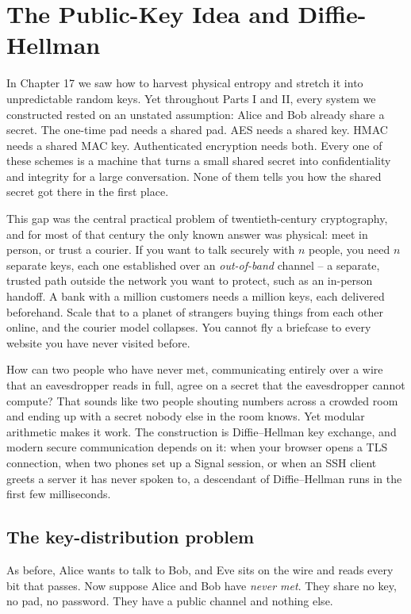\chapter{The Public-Key Idea and Diffie-Hellman}

In Chapter 17 we saw how to harvest physical entropy and stretch it into unpredictable random keys. Yet throughout Parts I and II, every system we constructed rested on an unstated assumption: Alice and Bob already share a secret. The one-time pad needs a shared pad. AES needs a shared key. HMAC needs a shared MAC key. Authenticated encryption needs both. Every one of these schemes is a machine that turns a small shared secret into confidentiality and integrity for a large conversation. None of them tells you how the shared secret got there in the first place.

This gap was the central practical problem of twentieth-century cryptography, and for most of that century the only known answer was physical: meet in person, or trust a courier. If you want to talk securely with $n$ people, you need $n$ separate keys, each one established over an \emph{out-of-band} channel -- a separate, trusted path outside the network you want to protect, such as an in-person handoff. A bank with a million customers needs a million keys, each delivered beforehand. Scale that to a planet of strangers buying things from each other online, and the courier model collapses. You cannot fly a briefcase to every website you have never visited before.

How can two people who have never met, communicating entirely over a wire that an eavesdropper reads in full, agree on a secret that the eavesdropper cannot compute? That sounds like two people shouting numbers across a crowded room and ending up with a secret nobody else in the room knows. Yet modular arithmetic makes it work. The construction is Diffie--Hellman key exchange, and modern secure communication depends on it: when your browser opens a TLS connection, when two phones set up a Signal session, or when an SSH client greets a server it has never spoken to, a descendant of Diffie--Hellman runs in the first few milliseconds.

\chapterline

\section{The key-distribution problem}
\label{ch18:key-distribution}

As before, Alice wants to talk to Bob, and Eve sits on the wire and reads every bit that passes. Now suppose Alice and Bob have \emph{never met}. They share no key, no pad, no password. They have a public channel and nothing else.

